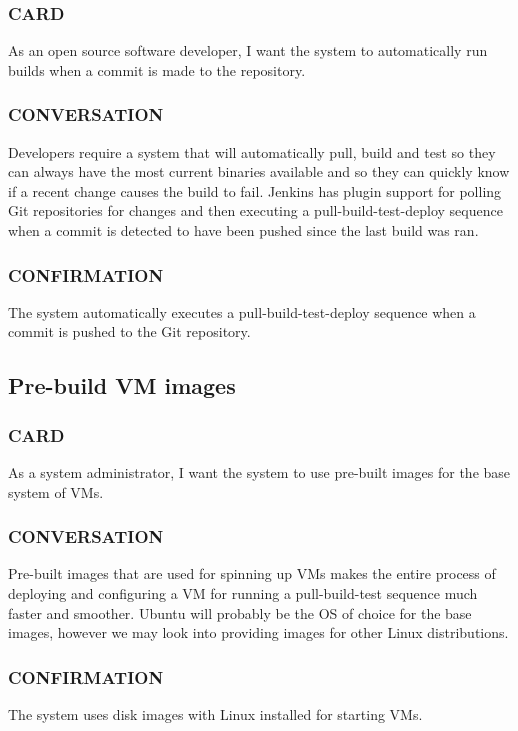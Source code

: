 \documentclass[10pt,letterpaper,onecolumn,journal]{IEEEtran}
\begin{document}
\subsubsection{CARD}
As an open source software developer, I want the system to automatically run builds when a commit is made to the repository.
\subsubsection{CONVERSATION}
Developers require a system that will automatically pull, build and test so they can always have the most current
binaries available and so they can quickly know if a recent change causes the build to fail. Jenkins has plugin support for polling
Git repositories for changes and then executing a pull-build-test-deploy sequence when a commit is detected to have been pushed since
the last build was ran.
\subsubsection{CONFIRMATION}
The system automatically executes a pull-build-test-deploy sequence when a commit is pushed to the Git repository.

\subsection{Pre-build VM images}
\subsubsection{CARD}
As a system administrator, I want the system to use pre-built images for the base system of VMs.
\subsubsection{CONVERSATION}
Pre-built images that are used for spinning up VMs makes the entire process of deploying and configuring a VM
for running a pull-build-test sequence much faster and smoother. Ubuntu will probably be the OS of choice for the base images, however
we may look into providing images for other Linux distributions.
\subsubsection{CONFIRMATION}
The system uses disk images with Linux installed for starting VMs.
\clearpage


\end{document}
